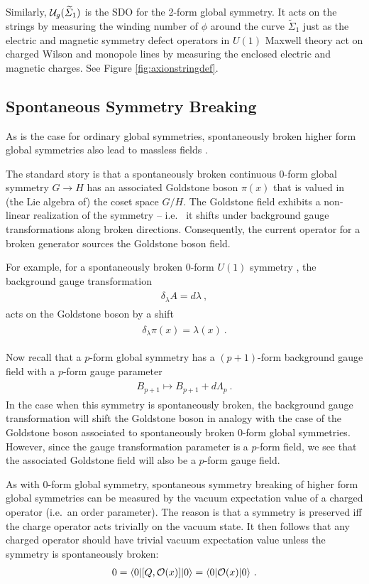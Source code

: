 \documentclass[11pt]{article}
\newcommand{\eq}[1]{\begin{align}\begin{split}#1\end{split}\end{align}}
\def\CO {{\cal O}}
\def\CO {{\cal O}}
\def\CU {{\cal U}}
\begin{document}
Similarly,  $\CU_g(\widetilde\Sigma_1)$ is the SDO for the 2-form global symmetry. It acts on the strings by measuring the winding number of $\phi$ around the curve $\widetilde\Sigma_1$ just as the electric and magnetic symmetry defect operators in $U(1)$ Maxwell theory act on  charged Wilson and monopole lines by measuring the enclosed electric and magnetic charges.  See Figure \ref{fig:axionstringdef}. 
  
\subsection{Spontaneous Symmetry Breaking}

As is the case for ordinary global symmetries, spontaneously broken higher form global symmetries also lead to massless fields \cite{Gaiotto:2014kfa,Lake:2018dqm}. 

The standard story is that a spontaneously broken continuous 0-form global symmetry $G\to H$  has an associated Goldstone boson $\pi(x)$ that is valued in (the Lie algebra of) the coset space $G/H$. The Goldstone field exhibits a non-linear realization of the symmetry -- i.e.~  it shifts under background gauge transformations along broken directions. Consequently,  the current operator for a broken generator  sources the Goldstone boson field.  

For example, for a spontaneously broken 0-form $U(1)$ symmetry , the background gauge transformation 
\eq{
\delta_\lambda A =d\lambda~,
}
acts on the Goldstone boson by a shift
\eq{
 \delta_\lambda \pi(x)= \lambda(x)~.
} 

Now recall that a  $p$-form global symmetry has a $(p+1)$-form background gauge field with a  $p$-form gauge parameter
\eq{
B_{p+1} \longmapsto B_{p+1}+d\Lambda_p~.
}
In the case when this symmetry is spontaneously broken, the background gauge transformation will shift the Goldstone boson in analogy with the case of the Goldstone boson associated to spontaneously broken 0-form global symmetries. However, since the gauge transformation parameter is a $p$-form field, we see that the associated Goldstone field will also be a $p$-form gauge field. 

As with 0-form global symmetry, spontaneous symmetry breaking of higher form  global symmetries can be measured by the vacuum expectation value of a charged operator (i.e.~an order parameter). The reason is that a symmetry is preserved iff the charge operator acts trivially on the vacuum state. It then follows that any charged operator should have trivial vacuum expectation value unless the symmetry is spontaneously broken:
\eq{
0=\langle0|[Q,\CO(x)]|0\rangle=\langle0|\CO(x)|0\rangle~.
} 
\end{document}
